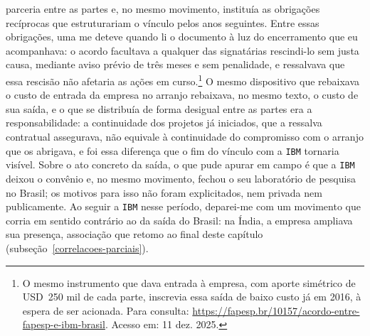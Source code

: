 parceria entre as partes e, no mesmo movimento, instituía as obrigações recíprocas que estruturariam o vínculo pelos anos seguintes. Entre essas obrigações, uma me deteve quando li o documento à luz do encerramento que eu acompanhava: o acordo facultava a qualquer das signatárias rescindi-lo sem justa causa, mediante aviso prévio de três meses e sem penalidade, e ressalvava que essa rescisão não afetaria as ações em curso.\footnote{O mesmo instrumento que dava entrada à empresa, com aporte simétrico de USD~250 mil de cada parte, inscrevia essa saída de baixo custo já em 2016, à espera de ser acionada. Para consulta: \url{https://fapesp.br/10157/acordo-entre-fapesp-e-ibm-brasil}. Acesso em: 11 dez. 2025.} O mesmo dispositivo que rebaixava o custo de entrada da empresa no arranjo rebaixava, no mesmo texto, o custo de sua saída, e o que se distribuía de forma desigual entre as partes era a responsabilidade: a continuidade dos projetos já iniciados, que a ressalva contratual assegurava, não equivale à continuidade do compromisso com o arranjo que os abrigava, e foi essa diferença que o fim do vínculo com a \texttt{IBM} tornaria visível. Sobre o ato concreto da saída, o que pude apurar em campo é que a \texttt{IBM} deixou o convênio e, no mesmo movimento, fechou o seu laboratório de pesquisa no Brasil; os motivos para isso não foram explicitados, nem privada nem publicamente. Ao seguir a \texttt{IBM} nesse período, deparei-me com um movimento que corria em sentido contrário ao da saída do Brasil: na Índia, a empresa ampliava sua presença, associação que retomo ao final deste capítulo (subseção~\ref{correlacoes-parciais}). 

